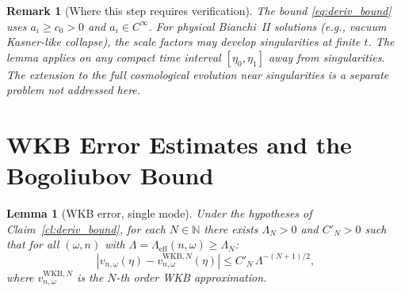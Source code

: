 \documentclass[11pt, a4paper]{article}
\newtheorem{lemma}[theorem]{Lemma}
\newtheorem{remark}[theorem]{Remark}
\newcommand{\NN}{\mathbb{N}}
\newcommand{\om}{\omega}
\newcommand{\Lam}{\Lambda}
\begin{document}
\begin{remark}[Where this step requires verification]
  The bound \eqref{eq:deriv_bound} uses $a_i \geq c_0 > 0$ and
  $a_i \in C^\infty$. For physical Bianchi~II solutions (e.g.,
  vacuum Kasner-like collapse), the scale factors may develop
  singularities at finite $t$. The lemma applies on any compact
  time interval $[\eta_0, \eta_1]$ away from singularities.
  The extension to the full cosmological evolution near singularities
  is a separate problem not addressed here.
\end{remark}

\section{WKB Error Estimates and the Bogoliubov Bound}

\begin{lemma}[WKB error, single mode]\label{lem:WKB_error}
  Under the hypotheses of Claim~\ref{cl:deriv_bound},
  for each $N \in \NN$ there exists $\Lam_N > 0$ and $C'_N > 0$
  such that for all $(\om, n)$ with $\Lam = \Lam_{\mathrm{eff}}(n,\om) \geq \Lam_N$:
  \begin{equation}\label{eq:WKB_error}
    \left|v_{n,\om}(\eta) - v_{n,\om}^{\mathrm{WKB},N}(\eta)\right|
    \leq C'_N\,\Lam^{-(N+1)/2},
  \end{equation}
  where $v_{n,\om}^{\mathrm{WKB},N}$ is the $N$-th order WKB approximation.
\end{lemma}
\end{document}
